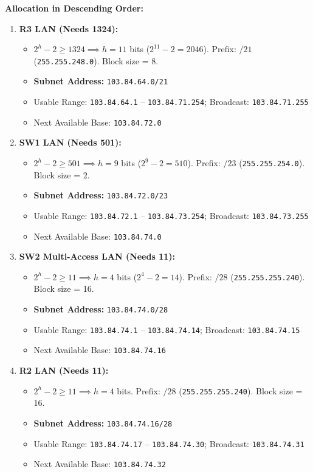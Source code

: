\documentclass[11pt,a4paper]{article}
\begin{document}
\textbf{Allocation in Descending Order:}
\begin{enumerate}
    \item \textbf{R3 LAN (Needs 1324):}
    \begin{itemize}
        \item $2^h - 2 \ge 1324 \implies h = 11$ bits ($2^{11} - 2 = 2046$). Prefix: $/21$ (\texttt{255.255.248.0}). Block size = 8.
        \item \textbf{Subnet Address:} \texttt{103.84.64.0/21}
        \item Usable Range: \texttt{103.84.64.1} -- \texttt{103.84.71.254}; Broadcast: \texttt{103.84.71.255}
        \item Next Available Base: \texttt{103.84.72.0}
    \end{itemize}

    \item \textbf{SW1 LAN (Needs 501):}
    \begin{itemize}
        \item $2^h - 2 \ge 501 \implies h = 9$ bits ($2^9 - 2 = 510$). Prefix: $/23$ (\texttt{255.255.254.0}). Block size = 2.
        \item \textbf{Subnet Address:} \texttt{103.84.72.0/23}
        \item Usable Range: \texttt{103.84.72.1} -- \texttt{103.84.73.254}; Broadcast: \texttt{103.84.73.255}
        \item Next Available Base: \texttt{103.84.74.0}
    \end{itemize}

    \item \textbf{SW2 Multi-Access LAN (Needs 11):}
    \begin{itemize}
        \item $2^h - 2 \ge 11 \implies h = 4$ bits ($2^4 - 2 = 14$). Prefix: $/28$ (\texttt{255.255.255.240}). Block size = 16.
        \item \textbf{Subnet Address:} \texttt{103.84.74.0/28}
        \item Usable Range: \texttt{103.84.74.1} -- \texttt{103.84.74.14}; Broadcast: \texttt{103.84.74.15}
        \item Next Available Base: \texttt{103.84.74.16}
    \end{itemize}

    \item \textbf{R2 LAN (Needs 11):}
    \begin{itemize}
        \item $2^h - 2 \ge 11 \implies h = 4$ bits. Prefix: $/28$ (\texttt{255.255.255.240}). Block size = 16.
        \item \textbf{Subnet Address:} \texttt{103.84.74.16/28}
        \item Usable Range: \texttt{103.84.74.17} -- \texttt{103.84.74.30}; Broadcast: \texttt{103.84.74.31}
        \item Next Available Base: \texttt{103.84.74.32}
    \end{itemize}


\end{enumerate}
\end{document}
